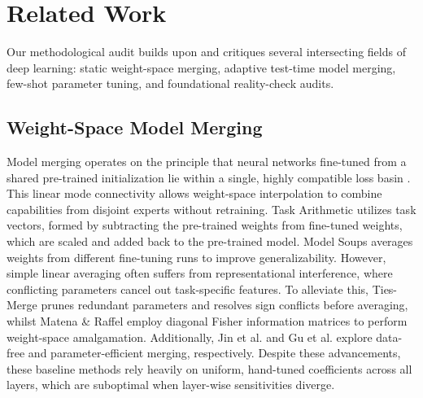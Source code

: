 \section{Related Work}
\label{sec:related_work}

Our methodological audit builds upon and critiques several intersecting fields of deep learning: static weight-space merging, adaptive test-time model merging, few-shot parameter tuning, and foundational reality-check audits.

\subsection{Weight-Space Model Merging}
Model merging operates on the principle that neural networks fine-tuned from a shared pre-trained initialization lie within a single, highly compatible loss basin \cite{izmailov2018averaging,cha2021swad}.
This linear mode connectivity allows weight-space interpolation to combine capabilities from disjoint experts without retraining.
Task Arithmetic \cite{ilharco2022editing} utilizes task vectors, formed by subtracting the pre-trained weights from fine-tuned weights, which are scaled and added back to the pre-trained model.
Model Soups \cite{wortsman2022model} averages weights from different fine-tuning runs to improve generalizability.
However, simple linear averaging often suffers from representational interference, where conflicting parameters cancel out task-specific features.
To alleviate this, Ties-Merge \cite{yadav2023ties} prunes redundant parameters and resolves sign conflicts before averaging, whilst Matena \& Raffel \cite{matena2021merging} employ diagonal Fisher information matrices to perform weight-space amalgamation.
Additionally, Jin et al. \cite{jin2022dataless} and Gu et al. \cite{gu2024advancing} explore data-free and parameter-efficient merging, respectively.
Despite these advancements, these baseline methods rely heavily on uniform, hand-tuned coefficients across all layers, which are suboptimal when layer-wise sensitivities diverge.

